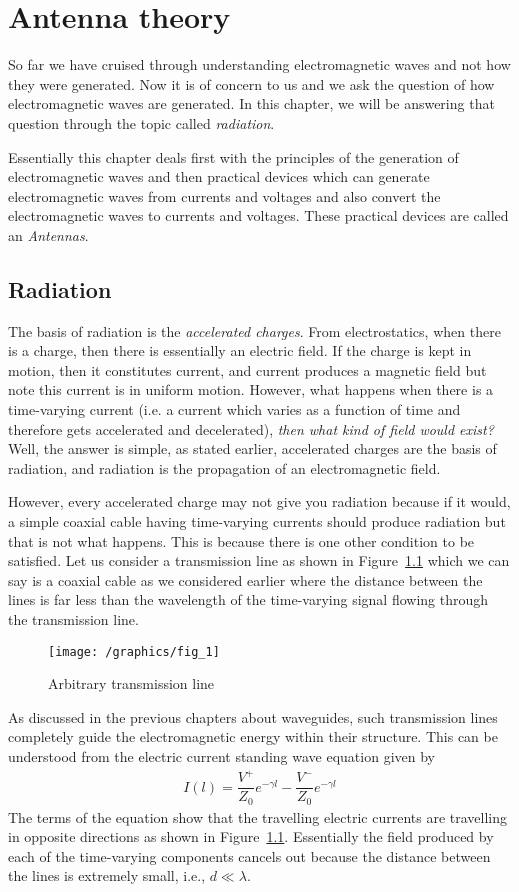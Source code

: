 \chapter{Antenna theory}
So far we have cruised through understanding electromagnetic waves and not how they were generated. Now it is of concern to us and we ask the question of how electromagnetic waves are generated. In this chapter, we will be answering that question through the topic called \emph{radiation}. 

Essentially this chapter deals first with the principles of the generation of electromagnetic waves and then practical devices which can generate electromagnetic waves from currents and voltages and also convert the electromagnetic waves to currents and voltages. These practical devices are called an \emph{Antennas}.

\section{Radiation}
The basis of radiation is the \emph{accelerated charges}. From electrostatics, when there is a charge, then there is essentially an electric field. If the charge is kept in motion, then it constitutes current, and current produces a magnetic field but note this current is in uniform motion. However, what happens when there is a time-varying current (i.e. a current which varies as a function of time and therefore gets accelerated and decelerated), \emph{then what kind of field would exist?} Well, the answer is simple, as stated earlier, accelerated charges are the basis of radiation, and radiation is the propagation of an electromagnetic field.

However, every accelerated charge may not give you radiation because if it would, a simple coaxial cable having time-varying currents should produce radiation but that is not what happens. This is because there is one other condition to be satisfied. Let us consider a transmission line as shown in Figure~\ref{fig:txnsline} which we can say is a coaxial cable as we considered earlier where the distance between the lines is far less than the wavelength of the time-varying signal flowing through the transmission line.
\begin{figure}[h]
\centering
\texttt{[image: /graphics/fig\_1]}
\caption{Arbitrary transmission line}
\label{fig:txnsline}
\end{figure}

As discussed in the previous chapters about waveguides, such transmission lines completely guide the electromagnetic energy within their structure. This can be understood from the electric current standing wave equation given by
\begin{align*}
I(l)=\dfrac{V^+}{Z_0}e^{-\gamma l} - \dfrac{V^-}{Z_0}e^{-\gamma l}
\end{align*}
The terms of the equation show that the travelling electric currents are travelling in opposite directions as shown in Figure~\ref{fig:txnsline}. Essentially the field produced by each of the time-varying components cancels out because the distance between the lines is extremely small, i.e., $d\ll\lambda$. 

